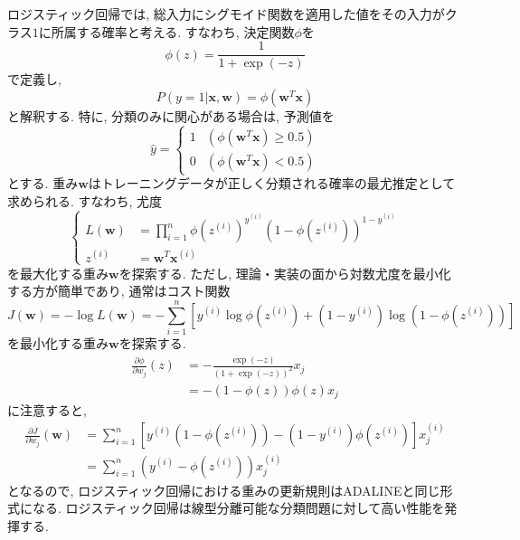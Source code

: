\documentclass[uplatex]{jsarticle}
\theoremstyle{definition}
\numberwithin{equation}{section}
\begin{document}
ロジスティック回帰では, 総入力にシグモイド関数を適用した値をその入力がクラス$1$に所属する確率と考える.
すなわち, 決定関数$\phi$を
\begin{equation}
    \phi(z) = \frac{1}{1 + \exp(-z)}
\end{equation}
で定義し, 
\begin{equation}
    P(y = 1|\bm{x}, \bm{w}) = \phi(\bm{w}^{T}\bm{x})
\end{equation}
と解釈する.
特に, 分類のみに関心がある場合は, 予測値を
\begin{equation}
    \hat{y} = 
    \begin{cases}
        1 & (\phi(\bm{w}^{T}\bm{x}) \geq 0.5) \\
        0 & (\phi(\bm{w}^{T}\bm{x}) < 0.5)
    \end{cases}
\end{equation}
とする.
重み$\bm{w}$はトレーニングデータが正しく分類される確率の最尤推定として求められる.
すなわち, 尤度
\begin{equation}
    \left\{
        \begin{aligned}
            L(\bm{w}) &= \prod_{i = 1}^{n} \phi(z^{(i)})^{y^{(i)}}(1 - \phi(z^{(i)}))^{1 - y^{(i)}} \\
            z^{(i)} &= \bm{w}^{T}\bm{x}^{(i)}
        \end{aligned}
    \right.
\end{equation}
を最大化する重み$\bm{w}$を探索する.
ただし, 理論・実装の面から対数尤度を最小化する方が簡単であり, 通常はコスト関数
\begin{equation}
    J(\bm{w}) = -\log L(\bm{w}) = -\sum_{i = 1}^{n} \left[y^{(i)}\log \phi(z^{(i)}) + (1 - y^{(i)})\log(1 - \phi(z^{(i)}))\right]
\end{equation}
を最小化する重み$\bm{w}$を探索する.
\begin{align}
    \frac{\partial \phi}{\partial w_{j}}(z)
    &= -\frac{\exp(-z)}{(1 + \exp(-z))^{2}}x_{j} \\
    &= -(1 - \phi(z))\phi(z)x_{j}
\end{align}
に注意すると, 
\begin{align}
    \frac{\partial J}{\partial w_{j}}(\bm{w})
    &= \sum_{i = 1}^{n} \left[y^{(i)}(1 - \phi(z^{(i)})) - (1 - y^{(i)})\phi(z^{(i)})\right]x^{(i)}_{j} \\
    &= \sum_{i = 1}^{n} (y^{(i)} - \phi(z^{(i)}))x^{(i)}_{j}
\end{align}
となるので, ロジスティック回帰における重みの更新規則はADALINEと同じ形式になる.
ロジスティック回帰は線型分離可能な分類問題に対して高い性能を発揮する.
\end{document}
